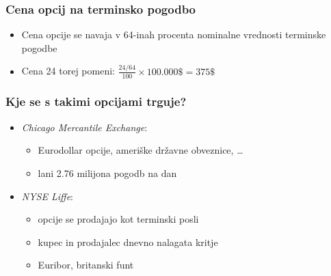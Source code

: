 \documentclass[14pt]{beamer}
\begin{document}
%    
%

\begin{frame}
    \frametitle{Cena opcij na terminsko pogodbo}
    \begin{itemize}
        \item Cena opcije se navaja v 64-inah procenta nominalne vrednosti terminske pogodbe
        \item Cena 24 torej pomeni: $\frac{24/64}{100}\times 100.000\$ = 375\$$
    \end{itemize}
\end{frame}

\begin{frame}
    \frametitle{Kje se s takimi opcijami trguje?}
        \begin{itemize}
            \item \textit{Chicago Mercantile Exchange}:
                \begin{itemize}
                    \item Eurodollar opcije, ameriške državne obveznice, \ldots
                    \item lani 2.76 milijona pogodb na dan
                \end{itemize}
            \item \textit{NYSE Liffe}:
                \begin{itemize}
                    \item opcije se prodajajo kot terminski posli
                    \item kupec in prodajalec dnevno nalagata kritje
                    \item Euribor, britanski funt
                \end{itemize}
        \end{itemize}
\end{frame}
\end{document}
